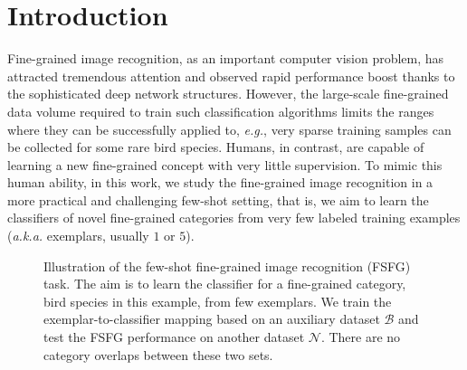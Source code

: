 \documentclass[10pt,twocolumn,letterpaper]{article}
\begin{document}
\section{Introduction}

Fine-grained image recognition, as an important computer vision problem, has attracted tremendous attention and observed rapid performance boost thanks to the sophisticated deep network structures. However, the large-scale fine-grained data volume required to train such classification algorithms limits the ranges where they can be successfully applied to, \emph{e.g.}, very sparse training samples can be collected for some rare bird species. Humans, in contrast, are capable of learning a new fine-grained concept with very little supervision. To mimic this human ability, in this work, we study the fine-grained image recognition in a more practical and challenging few-shot setting, that is, we aim to learn the classifiers of novel fine-grained categories from very few labeled training examples (\emph{a.k.a.} exemplars, usually $1$ or $5$). 

\begin{figure}[t!]
\caption{Illustration of the few-shot fine-grained image recognition (FSFG) task. The aim is to learn the classifier for a fine-grained category, bird species in this example, from few exemplars. We train the exemplar-to-classifier mapping based on an auxiliary dataset $\mathcal{B}$ and test the FSFG performance on another dataset $\mathcal{N}$. There are no category overlaps between these two sets.
}
\label{fig:fewshot}
\end{figure}
\end{document}
